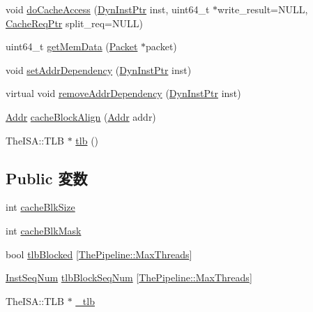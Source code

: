 \begin{DoxyCompactItemize}
\item 
void \hyperlink{classCacheUnit_afc4f09d8e36072c3a3c361f2edf108b4}{doCacheAccess} (\hyperlink{classRefCountingPtr}{DynInstPtr} inst, uint64\_\-t $\ast$write\_\-result=NULL, \hyperlink{classCacheRequest}{CacheReqPtr} split\_\-req=NULL)
\item 
uint64\_\-t \hyperlink{classCacheUnit_a1325b5bcdbbf4f0ba799cdda17265b72}{getMemData} (\hyperlink{classPacket}{Packet} $\ast$packet)
\item 
void \hyperlink{classCacheUnit_a4244e66bc15f13c2dbec20ca5fcea3d4}{setAddrDependency} (\hyperlink{classRefCountingPtr}{DynInstPtr} inst)
\item 
virtual void \hyperlink{classCacheUnit_a8a894d91761439227fd27d91a318c31f}{removeAddrDependency} (\hyperlink{classRefCountingPtr}{DynInstPtr} inst)
\item 
\hyperlink{base_2types_8hh_af1bb03d6a4ee096394a6749f0a169232}{Addr} \hyperlink{classCacheUnit_a6a734ac8ee8c7fbe0df3fed5826a52ef}{cacheBlockAlign} (\hyperlink{base_2types_8hh_af1bb03d6a4ee096394a6749f0a169232}{Addr} addr)
\item 
TheISA::TLB $\ast$ \hyperlink{classCacheUnit_a3cf8b27760278d20d4aa9463f52a2d95}{tlb} ()
\end{DoxyCompactItemize}
\subsection*{Public 変数}
\begin{DoxyCompactItemize}
\item 
int \hyperlink{classCacheUnit_a9d95d13b55fcaa47810d188d54903caf}{cacheBlkSize}
\item 
int \hyperlink{classCacheUnit_a4abab6f8643f5958a53eec1355be3ebd}{cacheBlkMask}
\item 
bool \hyperlink{classCacheUnit_a1e5ca2b940e91b19e93867cc549fe65d}{tlbBlocked} \mbox{[}\hyperlink{namespaceThePipeline_ac9c0bbe9cf27d93e08ea8ccc4096e633}{ThePipeline::MaxThreads}\mbox{]}
\item 
\hyperlink{inst__seq_8hh_a258d93d98edaedee089435c19ea2ea2e}{InstSeqNum} \hyperlink{classCacheUnit_a26ded431132c6ee52a8b8bdc8ddd837c}{tlbBlockSeqNum} \mbox{[}\hyperlink{namespaceThePipeline_ac9c0bbe9cf27d93e08ea8ccc4096e633}{ThePipeline::MaxThreads}\mbox{]}
\item 
TheISA::TLB $\ast$ \hyperlink{classCacheUnit_a5aa23855b427a009f3334c95a146084b}{\_\-tlb}
\end{DoxyCompactItemize}
